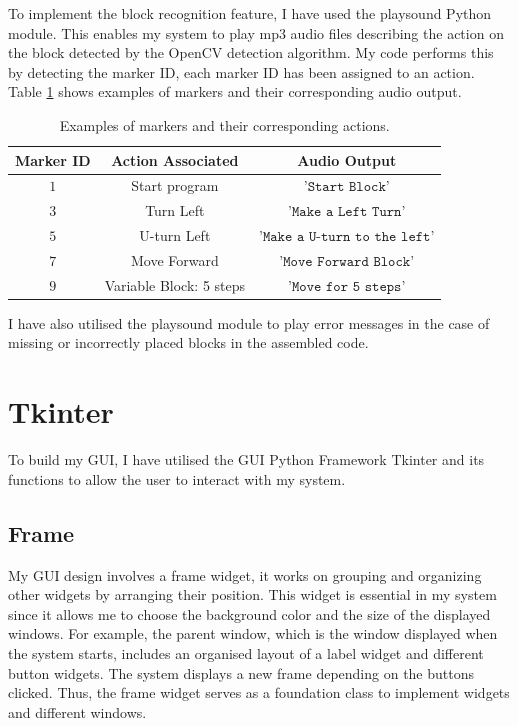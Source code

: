 \documentclass[oneside,%
                    author={Malak Hajji},
                    degree={BSc},
                    title={Designing An Accessible Ozobot Programming Platform for Students},
                  subtitle={With Mixed Visual Abilities}]{dissertation}
\begin{document}
To implement the block recognition feature, I have used the playsound Python module. This enables my system to play mp3 audio files describing the action on the block detected by the OpenCV detection algorithm. My code performs this by detecting the marker ID, each marker ID has been assigned to an action. Table \ref{tab-sound} shows examples of markers and their corresponding audio output.
\FloatBarrier
\begin{table}[h]
\centering
\begin{tabular}{|c|c|c|}
\hline
Marker ID      & Action Associated      & Audio Output      \\
\hline
$1     $ & Start program  & $\texttt{'Start Block'}   $ \\
$3     $ & Turn Left      & $\texttt{'Make a Left Turn'}   $ \\
$5     $ &U-turn Left& $ \texttt{'Make a U-turn to the left'} $\\
$7     $ & Move Forward & $\texttt{'Move Forward Block'}   $ \\
$9     $ & Variable Block: 5 steps   & $\texttt{'Move for 5 steps'} $ \\
\hline
\end{tabular}
\caption{Examples of markers and their corresponding actions.}
\label{tab-sound}
\end{table}
\FloatBarrier

I have also utilised the playsound module to play error messages in the case of missing or incorrectly placed blocks in the assembled code.


\section{Tkinter}

To build my GUI, I have utilised the GUI Python Framework Tkinter and its functions to allow the user to interact with my system.

\subsection{Frame}
My GUI design involves a frame widget, it works on grouping and organizing other widgets by arranging their position. This widget is essential in my system since it allows me to choose the background color and the size of the displayed windows. For example, the parent window, which is the window displayed when the system starts, includes an organised layout of a label widget and different button widgets. The system displays a new frame depending on the buttons clicked. Thus, the frame widget serves as a foundation class to implement widgets and different windows.
\end{document}
